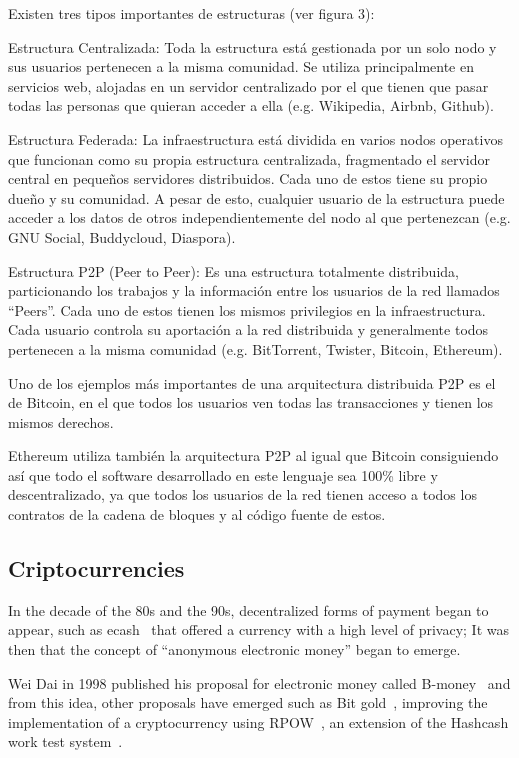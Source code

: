 Existen tres tipos importantes de estructuras (ver figura 3):

Estructura Centralizada: Toda la estructura está gestionada por un solo nodo y
sus usuarios pertenecen a la misma comunidad. Se utiliza principalmente en
servicios web, alojadas en un servidor centralizado por el que tienen que pasar
todas las personas que quieran acceder a ella (e.g. Wikipedia, Airbnb, Github).

Estructura Federada: La infraestructura está dividida en varios nodos operativos
que funcionan como su propia estructura centralizada, fragmentado el servidor
central en pequeños servidores distribuidos. Cada uno de estos tiene su propio
dueño y su comunidad. A pesar de esto, cualquier usuario de la estructura puede
acceder a los datos de otros independientemente del nodo al que pertenezcan
(e.g. GNU Social, Buddycloud, Diaspora).

Estructura P2P (Peer to Peer): Es una estructura totalmente distribuida,
particionando los trabajos y la información entre los usuarios de la red
llamados “Peers”. Cada uno de estos tienen los mismos privilegios en la
infraestructura. Cada usuario controla su aportación a la red distribuida y
generalmente todos pertenecen a la misma comunidad (e.g. BitTorrent, Twister,
Bitcoin, Ethereum).


Uno de los ejemplos más importantes de una arquitectura distribuida P2P es el de
Bitcoin, en el que todos los usuarios ven todas las transacciones y tienen los
mismos derechos.

Ethereum utiliza también la arquitectura P2P al igual que Bitcoin consiguiendo
así que todo el software desarrollado en este lenguaje sea 100\% libre y
descentralizado, ya que todos los usuarios de la red tienen acceso a todos los
contratos de la cadena de bloques y al código fuente de estos.
\subsection{Criptocurrencies}
\label{tb:cryptos}
In the decade of the 80s and the 90s, decentralized forms of payment began to
appear, such as ecash~\cite{chaum1995introduction} that offered a currency with
a high level of privacy; It was then that the concept of ``anonymous electronic
money'' began to emerge.

Wei Dai in 1998 published his proposal for electronic money called
B-money~\cite{bmoney} and from this idea, other proposals have emerged such as
Bit gold~\cite{bitgold}, improving the implementation of a cryptocurrency using
RPOW~\cite{finney2005rpow}, an extension of the Hashcash work test
system~\cite{back2002hashcash}.

